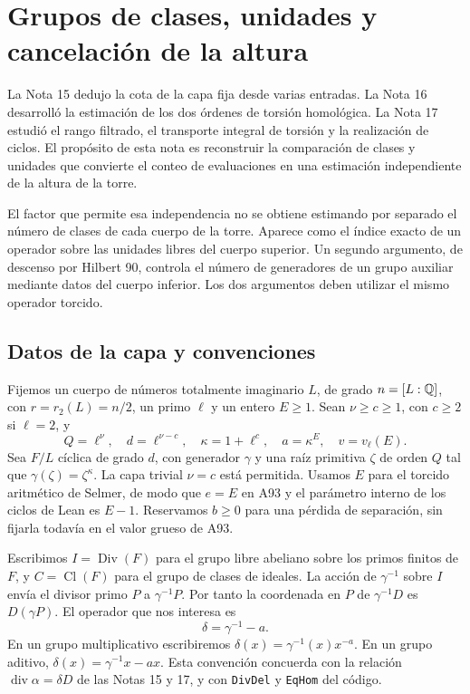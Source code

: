 \section{Grupos de clases, unidades y cancelación de la altura}
\label{sec:clases-unidades}

La Nota 15 dedujo la cota de la capa fija desde varias entradas. La Nota 16 desarrolló la estimación de los dos órdenes de torsión homológica. La Nota 17 estudió el rango filtrado, el transporte integral de torsión y la realización de ciclos. El propósito de esta nota es reconstruir la comparación de clases y unidades que convierte el conteo de evaluaciones en una estimación independiente de la altura de la torre.

El factor que permite esa independencia no se obtiene estimando por separado el número de clases de cada cuerpo de la torre. Aparece como el índice exacto de un operador sobre las unidades libres del cuerpo superior. Un segundo argumento, de descenso por Hilbert 90, controla el número de generadores de un grupo auxiliar mediante datos del cuerpo inferior. Los dos argumentos deben utilizar el mismo operador torcido.

\subsection{Datos de la capa y convenciones}

Fijemos un cuerpo de números totalmente imaginario $L$, de grado $n=[L:\mathbb{Q}]$, con $r=r_2(L)=n/2$, un primo $\ell$ y un entero $E\ge1$. Sean $\nu\ge c\ge1$, con $c\ge2$ si $\ell=2$, y
\begin{equation}
 Q=\ell^\nu,\quad d=\ell^{\nu-c},\quad
 \kappa=1+\ell^c,\quad a=\kappa^E,\quad v=v_\ell(E).
 \label{eq:cu-datos}
\end{equation}
Sea $F/L$ cíclica de grado $d$, con generador $\gamma$ y una raíz primitiva $\zeta$ de orden $Q$ tal que $\gamma(\zeta)=\zeta^\kappa$. La capa trivial $\nu=c$ está permitida. Usamos $E$ para el torcido aritmético de Selmer, de modo que $e=E$ en A93 y el parámetro interno de los ciclos de Lean es $E-1$. Reservamos $b\ge0$ para una pérdida de separación, sin fijarla todavía en el valor grueso de A93.

Escribimos $I=\operatorname{Div}(F)$ para el grupo libre abeliano sobre los primos finitos de $F$, y $C=\operatorname{Cl}(F)$ para el grupo de clases de ideales. La acción de $\gamma^{-1}$ sobre $I$ envía el divisor primo $P$ a $\gamma^{-1}P$. Por tanto la coordenada en $P$ de $\gamma^{-1}D$ es $D(\gamma P)$. El operador que nos interesa es
\begin{equation}
 \delta=\gamma^{-1}-a.
 \label{eq:cu-delta}
\end{equation}
En un grupo multiplicativo escribiremos $\delta(x)=\gamma^{-1}(x)x^{-a}$. En un grupo aditivo, $\delta(x)=\gamma^{-1}x-ax$. Esta convención concuerda con la relación $\operatorname{div}\alpha=\delta D$ de las Notas 15 y 17, y con \texttt{DivDel} y \texttt{EqHom} del código.

